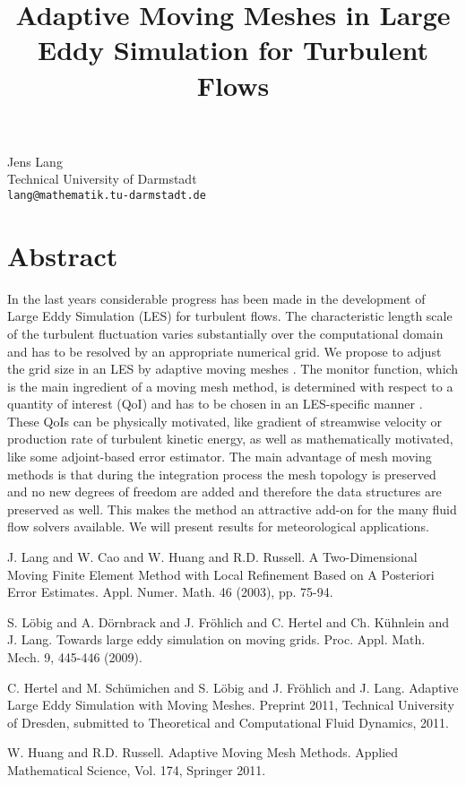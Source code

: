 \title{Adaptive Moving Meshes in Large Eddy Simulation for Turbulent Flows}
 \author{} \institute{}
\maketitle
\begin{center}
{\large Jens Lang}\\
Technical University of Darmstadt\\
{\tt lang@mathematik.tu-darmstadt.de}

\end{center}

\section*{Abstract}

In the last years considerable progress has been made in the development of Large Eddy Simulation (LES) for turbulent flows. The characteristic 
length scale of the turbulent fluctuation varies substantially over the computational domain and has to be resolved by an appropriate numerical 
grid. We propose to adjust the grid size in an LES by adaptive moving meshes \cite{lchr03,hr11}. The monitor function, which is the main ingredient of a moving
mesh method, is determined with respect to a quantity of interest (QoI) and has to be chosen in an LES-specific manner \cite{ldfhkl09,hslfj11}. These QoIs can be physically motivated, like gradient of streamwise velocity or production rate of turbulent kinetic energy, as well as mathematically motivated, like some adjoint-based error estimator. The main advantage of mesh moving methods is that during the integration process the mesh topology is preserved and no new degrees of freedom are added and therefore the data structures are preserved as well. This makes the method an attractive add-on for the many fluid flow solvers available. We will present results for meteorological applications.


\begin{thebibliography}{10}

{\sc J. Lang and W. Cao and W. Huang and R.D. Russell}. {A Two-Dimensional Moving Finite Element Method with Local Refinement Based  on A Posteriori Error Estimates}. Appl. Numer. Math. 46 (2003), pp. 75-94.



{\sc  S. L\"obig and A. D\"ornbrack and J. Fr\"ohlich and C. Hertel and Ch. K\"uhnlein and J. Lang}. {Towards large eddy simulation on moving grids}. Proc. Appl. Math. Mech. 9, 445-446 (2009).



{\sc C. Hertel and M. Sch\"umichen and S. L\"obig and J. Fr\"ohlich and J. Lang}. {Adaptive Large Eddy Simulation with Moving Meshes}. Preprint 2011, Technical University of Dresden, submitted to Theoretical  and Computational Fluid Dynamics, 2011.



{\sc W. Huang and R.D. Russell}. {Adaptive Moving Mesh Methods}. Applied Mathematical Science, Vol. 174, Springer 2011.

\end{thebibliography}
